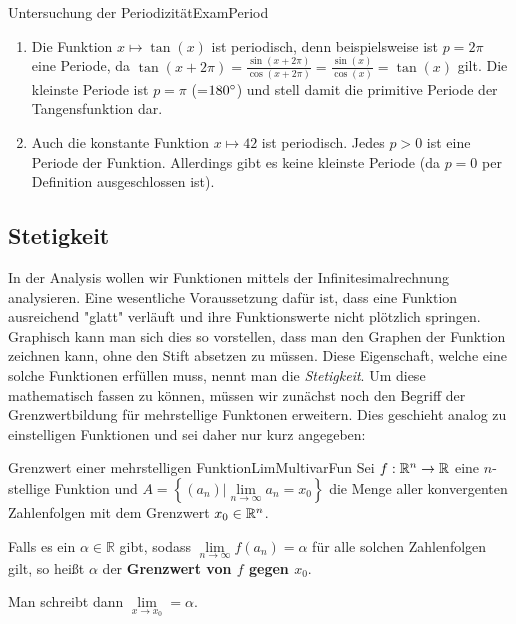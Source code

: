 \begin{example}{Untersuchung der Periodizität}{ExamPeriod}
    \begin{enumerate}
        \item Die Funktion $x \mapsto \tan(x)$ ist periodisch, denn beispielsweise ist $p=2\pi$ eine Periode, da $\tan(x+2\pi)=\frac{\sin(x+2\pi)}{\cos(x+2\pi)} = \frac{\sin(x)}{\cos(x)} = \tan(x)$ gilt. Die kleinste Periode ist $p=\pi$ (=$\SI{180}{\degree}$) und stell damit die primitive Periode der Tangensfunktion dar.
        \item Auch die konstante Funktion $x \mapsto 42$ ist periodisch. Jedes $p>0$ ist eine Periode der Funktion. Allerdings gibt es keine kleinste Periode (da $p=0$ per Definition ausgeschlossen ist).
    \end{enumerate}
\end{example}

\subsection{Stetigkeit}

In der Analysis wollen wir Funktionen mittels der Infinitesimalrechnung analysieren. Eine wesentliche Voraussetzung dafür ist, dass eine Funktion ausreichend "glatt" verläuft und ihre Funktionswerte nicht plötzlich springen. Graphisch kann man sich dies so vorstellen, dass man den Graphen der Funktion zeichnen kann, ohne den Stift absetzen zu müssen. Diese Eigenschaft, welche eine solche Funktionen erfüllen muss, nennt man die \emph{Stetigkeit}. Um diese mathematisch fassen zu können, müssen wir zunächst noch den Begriff der Grenzwertbildung für mehrstellige Funktonen erweitern. Dies geschieht analog zu einstelligen Funktionen und sei daher nur kurz angegeben:

\begin{definition}{Grenzwert einer mehrstelligen Funktion}{LimMultivarFun}
    Sei $f: \mathbb{R}^n \to \mathbb{R}$ eine $n$-stellige Funktion und $A = \left\lbrace (a_n) | \lim\limits_{n\to\infty} a_n = x_0 \right\rbrace$ die Menge aller konvergenten Zahlenfolgen mit dem Grenzwert $x_0\in\mathbb{R}^n$.

    Falls es ein $\alpha\in\mathbb{R}$ gibt, sodass $\lim\limits_{n\to\infty} f(a_n) = \alpha$ für alle solchen Zahlenfolgen gilt, so heißt $\alpha$ der \textbf{Grenzwert von $f$ gegen $x_0$}.

    Man schreibt dann $\lim\limits_{x\to x_0} = \alpha$.
\end{definition}

